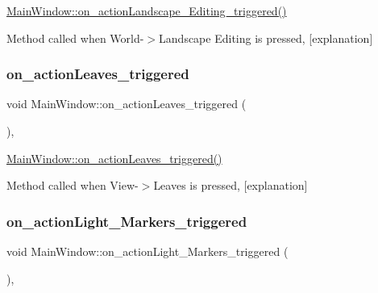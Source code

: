 \hyperlink{class_main_window_a80757bcc5466819ce28ceb0e7840a2eb}{Main\+Window\+::on\+\_\+action\+Landscape\+\_\+\+Editing\+\_\+triggered()} 

Method called when World-\/$>$Landscape Editing is pressed, \mbox{[}explanation\mbox{]} \mbox{\label{class_main_window_a6ef9945ba6ef944e564436d94b643c1c}} 
\subsubsection{\texorpdfstring{on\+\_\+action\+Leaves\+\_\+triggered}{on\_actionLeaves\_triggered}}
{\footnotesize\ttfamily void Main\+Window\+::on\+\_\+action\+Leaves\+\_\+triggered (\begin{DoxyParamCaption}{ }\end{DoxyParamCaption})\hspace{0.3cm}{\ttfamily [private]}, {\ttfamily [slot]}}



\hyperlink{class_main_window_a6ef9945ba6ef944e564436d94b643c1c}{Main\+Window\+::on\+\_\+action\+Leaves\+\_\+triggered()} 

Method called when View-\/$>$Leaves is pressed, \mbox{[}explanation\mbox{]} \mbox{\label{class_main_window_a761bc0d259399f5ddb9df53b0435e1d9}} 
\subsubsection{\texorpdfstring{on\+\_\+action\+Light\+\_\+\+Markers\+\_\+triggered}{on\_actionLight\_Markers\_triggered}}
{\footnotesize\ttfamily void Main\+Window\+::on\+\_\+action\+Light\+\_\+\+Markers\+\_\+triggered (\begin{DoxyParamCaption}{ }\end{DoxyParamCaption})\hspace{0.3cm}{\ttfamily [private]}, {\ttfamily [slot]}}



